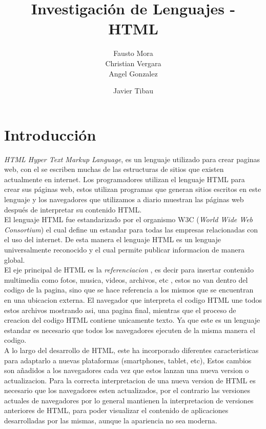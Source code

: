 \documentclass[11pt]{article} %
\title{Investigación de Lenguajes - HTML}
\author{Fausto Mora\\ Christian Vergara \\ Angel Gonzalez}
\begin{document}
\author{Javier Tibau}

\maketitle

\section{Introducción}
\newcommand{\oops}[1]{\textit{#1}}

\noindent \emph{HTML \oops{{\color{blue}Hyper Text Markup Language}}}, es un lenguaje utilizado para crear paginas web, con el se escriben muchas de las estructuras de sitios que existen actualmente en internet.
Los programadores utilizan el lenguaje HTML para crear sus páginas web, estos utilizan programas que generan sitios escritos en este lenguaje y los navegadores que utilizamos a diario muestran las páginas web después de interpretar su contenido HTML.\\

\noindent El lenguaje HTML fue estandarizado por el organismo W3C (\oops{World Wide Web Consortium}) el cual define un estandar para todas las empresas relacionadas con el uso del internet. De esta manera el lenguaje HTML es un lenguaje universalmente reconocido y el cual permite publicar informacion de manera global.\\

\noindent El eje principal de HTML es la \oops{referenciacion} , es decir para insertar contenido multimedia como fotos, musica, videos, archivos, etc , estos no van dentro del codigo de la pagina, sino que se hace referencia a los mismos que se encuentran en una ubicacion externa. El navegador que interpreta el codigo HTML une todos estos archivos mostrando asi, una pagina final, mientras que el proceso de creacion del codigo HTML contiene unicamente texto. Ya que este es un lenguaje estandar es necesario que todos los navegadores ejecuten de la misma manera el codigo.\\

\noindent A lo largo del desarrollo de HTML, este ha incorporado diferentes caracteristicas para adaptarlo a nuevas plataformas (smartphones, tablet, etc), Estos cambios son añadidos a los navegadores cada vez que estos lanzan una nueva version o actualizacion. Para la correcta interpretacion de una nueva version de HTML es necesario que los navegadores esten actualizados, por el contrario las versiones actuales de navegadores por lo general mantienen la interpretacion de versiones anteriores de HTML, para poder visualizar el contenido de aplicaciones desarrolladas por las mismas, aunque la apariencia no sea moderna.\\
\end{document}
